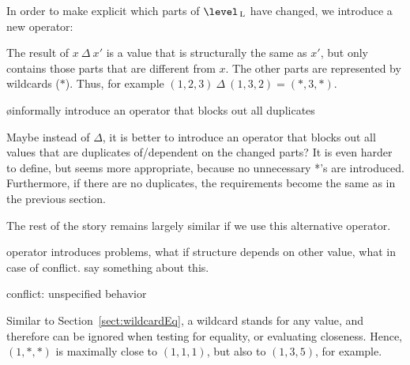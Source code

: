 In order to make explicit which parts of $\level\L$ have changed, we introduce a new operator:
 

The result of  $x~\Delta~x'$ is a value that is structurally the same as $x'$, but only contains those parts that are different from $x$. The other parts are represented by wildcards ($*$). Thus, for example $(1,2,3)~\Delta~(1,3,2) = (*,3,*)$.


\toHere

\bl
\o informally introduce an operator that blocks out all duplicates 
\el
{}

Maybe instead of $\Delta$, it is better to introduce an operator that blocks out all values that are duplicates of/dependent on the changed parts? It is even harder to define, but seems more appropriate, because no unnecessary *'s are introduced.
Furthermore, if there are no duplicates, the requirements become the same as in the previous section.

The rest of the story remains largely similar if we use this alternative operator.

operator introduces problems, what if structure depends on other value, what in case of conflict. say something about this.

conflict: unspecified behavior 
\fromHere

Similar to Section~\ref{sect:wildcardEq}, a wildcard stands for any value, and therefore can be ignored when testing for equality, or evaluating closeness. Hence, $(1,*,*)$ is maximally close to $(1,1,1)$, but also to $(1,3,5)$, for example.


%

%
%
%

